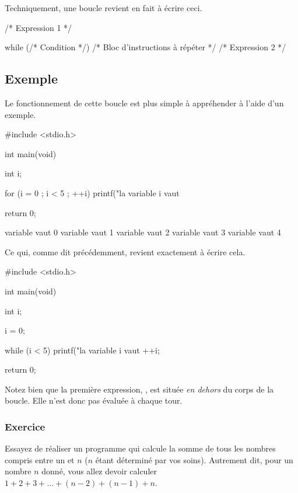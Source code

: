 Techniquement, une boucle  revient en fait à écrire ceci.

\begin{C}
/* Expression 1 */

while (/* Condition */)
{
    /* Bloc d'instructions à répéter */
    /* Expression 2 */
}
\end{C}

\subsection{Exemple}
\label{exemple-8}

Le fonctionnement de cette boucle est plus simple à appréhender à l'aide
d'un exemple.

\begin{C}
#include <stdio.h>


int main(void)
{
    int i;

    for (i = 0 ; i < 5 ; ++i)
        printf("la variable i vaut %

    return 0;
}
\end{C}

\begin{C}
variable vaut 0
variable vaut 1
variable vaut 2
variable vaut 3
variable vaut 4
\end{C}

Ce qui, comme dit précédemment, revient exactement à écrire cela.

\begin{C}
#include <stdio.h>


int main(void)
{
    int i;

    i = 0;

    while (i < 5)
    {
        printf("la variable i vaut %
        ++i;
    }

    return 0;
}
\end{C}

\begin{attentionbox}
  Notez bien que la première expression,
, est située \emph{en dehors} du corps de la boucle.
Elle n'est donc pas évaluée à chaque tour.
\end{attentionbox}

\subsubsection{Exercice}
\label{exercice-4}

Essayez de réaliser un programme qui calcule la somme de tous les
nombres compris entre un et \(n\) (\(n\) étant déterminé par vos soins).
Autrement dit, pour un nombre \(n\) donné, vous allez devoir calculer
\(1 + 2 + 3 + ... + (n-2) + (n-1) + n\).

